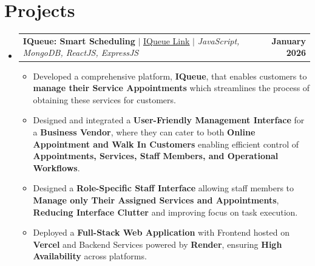 \documentclass[letterpaper,11pt]{article}
\makeatletter
\newcommand{\resumeItem}[1]{
  \item\small{
    {#1 \vspace{-2pt}}
  }
}
\newcommand{\resumeProjectHeading}[2]{
    \item
    \begin{tabular*}{1.001\textwidth}{l@{\extracolsep{\fill}}r}
      \small#1 & \textbf{\small #2}\\
    \end{tabular*}\vspace{-7pt}
}
\newcommand{\resumeSubHeadingListStart}{\begin{itemize}[leftmargin=0.0in, label={}]}
\newcommand{\resumeSubHeadingListEnd}{\end{itemize}}
\newcommand{\resumeItemListStart}{\begin{itemize}}
\newcommand{\resumeItemListEnd}{\end{itemize}\vspace{-5pt}}
\makeatother
\begin{document}
\section{Projects}
    \vspace{-5pt}
    \resumeSubHeadingListStart
          \resumeProjectHeading
          {\textbf{IQueue: Smart Scheduling} $|$ \href{https://iqueue-zeta.vercel.app}{\underline{IQueue Link}} $|$ \emph{JavaScript, MongoDB, ReactJS, ExpressJS}}{January 2026}
          \resumeItemListStart
          \resumeItem{Developed a comprehensive platform, \textbf{IQueue}, that enables customers to \textbf{manage their Service Appointments} which streamlines the process of obtaining these services for customers.}
          \resumeItem{Designed and integrated a \textbf{User-Friendly Management Interface} for a \textbf{Business Vendor}, where they can cater to both \textbf{Online Appointment and Walk In Customers} enabling efficient control of \textbf{Appointments, Services, Staff Members, and Operational Workflows}.}
          \resumeItem{Designed a \textbf{Role-Specific Staff Interface} allowing staff members to \textbf{Manage only Their Assigned Services and Appointments}, \textbf{Reducing Interface Clutter} and improving focus on task execution.}
          \resumeItem{Deployed a \textbf{Full-Stack Web Application} with Frontend hosted on \textbf{Vercel} and Backend Services powered by \textbf{Render}, ensuring \textbf{High Availability} across platforms.}
          \resumeItemListEnd 
    \resumeSubHeadingListEnd
\end{document}
